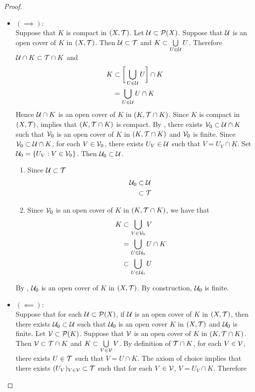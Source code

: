 \documentclass{book}
\begin{document}
	\begin{proof}\
		\begin{itemize}
			\item $(\implies)$: \\
				Suppose that $K$ is compact in $(X, \mathcal{T})$. Let $\mathcal{U} \subset \mathcal{P}(X)$. Suppose that $\mathcal{U}$ is an open cover of $K$ in $(X, \mathcal{T})$. Then $\mathcal{U} \subset \mathcal{T}$ and $K \subset \bigcup\limits_{U \in \mathcal{U}} U$. Therefore $\mathcal{U} \cap K \subset \mathcal{T} \cap K$ and  
			\begin{align*}
				K 
				& \subset \bigg[  \bigcup\limits_{U \in \mathcal{U}} U \bigg] \cap K \\ 
				& = \bigcup\limits_{U \in \mathcal{U}} U \cap K
			\end{align*}
			Hence $\mathcal{U} \cap K$ is an open cover of $K$ in $(K, \mathcal{T} \cap K)$. Since $K$ is compact in $(X, \mathcal{T})$,  implies that $(K, \mathcal{T} \cap K)$ is compact. By , there exists $\mathcal{V}_0 \subset \mathcal{U} \cap K$ such that $\mathcal{V}_0$ is an open cover of $K$ in $(K, \mathcal{T} \cap K)$ and $\mathcal{V}_0$ is finite. Since $\mathcal{V}_0 \subset \mathcal{U} \cap K$, for each $V \in \mathcal{V}_0$, there exists $U_V \in \mathcal{U}$ such that $V = U_V \cap K$. Set $\mathcal{U}_0 = \{U_V: V \in \mathcal{V}_0\}$. Then $\mathcal{U}_0 \subset \mathcal{U}$. 
			\begin{enumerate}
				\item Since $\mathcal{U} \subset \mathcal{T}$
				\begin{align*}
					\mathcal{U}_0 
					& \subset \mathcal{U} \\
					& \subset \mathcal{T}
				\end{align*}
				\item Since $\mathcal{V}_0$ is an open cover of $K$ in $(K, \mathcal{T} \cap K)$, we have that 
				\begin{align*}
					K 
					& \subset \bigcup_{V \in \mathcal{V}_0} V \\
					& = \bigcup_{U \in \mathcal{U}_0} U \cap K \\
					& \subset \bigcup_{U \in \mathcal{U}_0} U \\
				\end{align*}
			\end{enumerate} 
			By , $\mathcal{U}_0$ is an open cover of $K$ in $(X, \mathcal{T})$. By construction, $\mathcal{U}_0$ is finite. 
			\item $(\impliedby)$: \\
			Suppose that for each $\mathcal{U} \subset \mathcal{P}(X)$, if $\mathcal{U}$ is an open cover of $K$ in $(X, \mathcal{T})$, then there exists $\mathcal{U}_0 \subset \mathcal{U}$ such that $\mathcal{U}_0$ is an open cover $K$ in $(X, \mathcal{T})$ and $\mathcal{U}_0$ is finite. Let $\mathcal{V} \subset \mathcal{P}(K)$. Suppose that $\mathcal{V}$ is an open cover of $K$ in $(K, \mathcal{T} \cap K)$. Then $\mathcal{V} \subset \mathcal{T} \cap K$ and $K \subset \bigcup\limits_{V \in \mathcal{V}} V$. By definition of $\mathcal{T} \cap K$, for each $V \in \mathcal{V}$, there exists $U \in \mathcal{T}$ such that $V = U \cap K$. The axiom of choice implies that there exists $(U_V)_{V \in \mathcal{V}} \subset \mathcal{T}$ such that for each $V \in \mathcal{V}$, $V = U_V \cap K$. Therefore

\end{itemize}
\end{proof}
\end{document}
